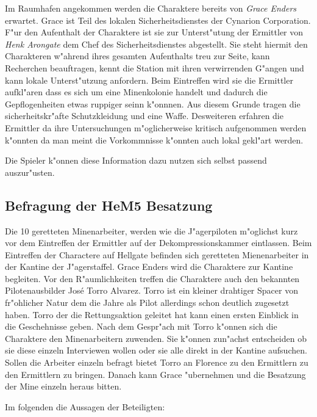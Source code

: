 Im Raumhafen angekommen werden die Charaktere bereits von \emph{Grace Enders} erwartet. Grace ist Teil  des lokalen Sicherheitsdienstes der Cynarion Corporation. F"ur den Aufenthalt der Charaktere ist sie zur Unterst"utung der Ermittler von \emph{Henk Arongate} dem Chef des Sicherheitsdienstes abgestellt. Sie steht hiermit den Charakteren w"ahrend ihres gesamten Aufenthalts treu zur Seite, kann Recherchen beauftragen, kennt die Station mit ihren verwirrenden G"angen und kann lokale Unterst"utzung anfordern. Beim Eintreffen wird sie die Ermittler aufkl"aren dass es sich um eine Minenkolonie handelt und dadurch die Gepflogenheiten etwas ruppiger seinn k"onnnen. Aus diesem Grunde tragen die sicherheitskr"afte Schutzkleidung und eine Waffe. Desweiteren erfahren die Ermittler da\3 ihre Untersuchungen m"oglicherweise kritisch aufgenommen werden k"onnten da man meint die Vorkommnisse k"onnten auch lokal gekl"art werden.

\begin{remarks}
	Die Spieler k"onnen diese Information dazu nutzen sich selbst passend auszur"usten.
\end{remarks}

\subsection{Befragung der HeM5 Besatzung}

Die 10 geretteten Minenarbeiter, werden wie die J"agerpiloten m"oglichst kurz vor dem Eintreffen der Ermittler auf der Dekompressionskammer eintlassen. Beim Eintreffen der Charactere auf Hellgate befinden sich geretteten Mienenarbeiter in der Kantine der J"agerstaffel. Grace Enders wird die Charaktere zur Kantine begleiten. Vor den R"aumlichkeiten treffen die Charaktere auch den bekannten Pilotenausbilder Jos\'{e} \frqq{}Torro\flqq{} Alvarez. Torro ist ein kleiner drahtiger Spacer von fr"ohlicher Natur dem die Jahre als Pilot allerdings schon deutlich zugesetzt haben. Torro der die Rettungsaktion geleitet hat kann einen ersten Einblick in die Geschehnisse geben. Nach dem Gespr"ach mit Torro k"onnen sich die Charaktere den Minenarbeitern zuwenden. Sie k"onnen zun"achst entscheiden ob sie diese einzeln Interviewen wollen oder sie alle direkt in der Kantine aufsuchen. Sollen die Arbeiter einzeln befragt bietet Torro an Florence zu den Ermittlern zu den Ermittlern zu bringen. Danach kann Grace "ubernehmen und die Besatzung der Mine einzeln heraus bitten.

Im folgenden die Aussagen der Beteiligten:

